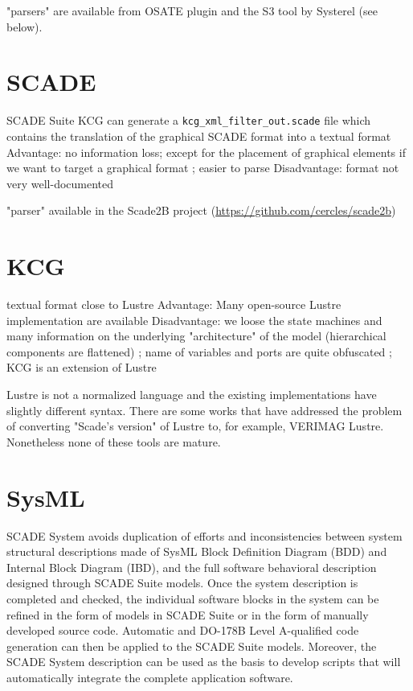\documentclass{template/openetcs_report}
\begin{document}
"parsers" are available from OSATE plugin and the S3 tool by Systerel (see below).

\section{SCADE}

SCADE Suite KCG can generate a \verb+kcg_xml_filter_out.scade+ file
which contains the translation of the graphical SCADE format into a
textual format Advantage: no information loss; except for the
placement of graphical elements if we want to target a graphical
format ; easier to parse Disadvantage: format not very well-documented

"parser" available in the Scade2B project (\url{https://github.com/cercles/scade2b})

\section{KCG}

textual format close to Lustre
Advantage: Many open-source Lustre implementation are available
Disadvantage: we loose the state machines and many information on the underlying "architecture" of the model (hierarchical components are flattened) ; name of variables and ports are quite obfuscated ; KCG is an extension of Lustre

Lustre is not a normalized language and the existing implementations have slightly different syntax. There are some works that have addressed the problem of converting "Scade's version" of Lustre to, for example, VERIMAG Lustre. Nonetheless none of these tools are mature.


\section{SysML}

SCADE System avoids duplication of efforts and inconsistencies between
system structural descriptions made of SysML Block Definition Diagram
(BDD) and Internal Block Diagram (IBD), and the full software
behavioral description designed through SCADE Suite models. Once the
system description is completed and checked, the individual software
blocks in the system can be refined in the form of models in SCADE
Suite or in the form of manually developed source code. Automatic and
DO-178B Level A-qualified code generation can then be applied to the
SCADE Suite models. Moreover, the SCADE System description can be used
as the basis to develop scripts that will automatically integrate the
complete application software.
\end{document}
